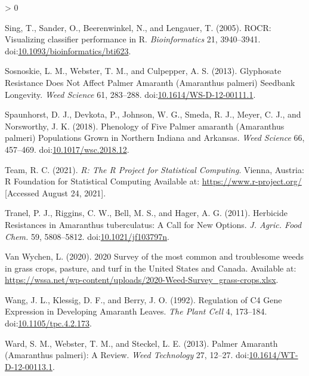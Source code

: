 \documentclass[utf8]{frontiersSCNS}
\newlength{\cslhangindent}
\newenvironment{CSLReferences}[2] %
 {%
  \setlength{\parindent}{0pt}
  \ifodd #1 \everypar{\setlength{\hangindent}{\cslhangindent}}\ignorespaces\fi
  \ifnum #2 > 0
  \setlength{\parskip}{#2\baselineskip}
  \fi
 }%
 {}
\begin{document}
\begin{CSLReferences}{1}{0}
\leavevmode\hypertarget{ref-sing2005}{}%
Sing, T., Sander, O., Beerenwinkel, N., and Lengauer, T. (2005). {ROCR}:
Visualizing classifier performance in {R}. \emph{Bioinformatics} 21,
3940--3941.
doi:\href{https://doi.org/10.1093/bioinformatics/bti623}{10.1093/bioinformatics/bti623}.

\leavevmode\hypertarget{ref-sosnoskie2013}{}%
Sosnoskie, L. M., Webster, T. M., and Culpepper, A. S. (2013).
Glyphosate {Resistance Does Not Affect Palmer Amaranth} ({Amaranthus}
palmeri) {Seedbank Longevity}. \emph{Weed Science} 61, 283--288.
doi:\href{https://doi.org/10.1614/WS-D-12-00111.1}{10.1614/WS-D-12-00111.1}.

\leavevmode\hypertarget{ref-spaunhorst2018}{}%
Spaunhorst, D. J., Devkota, P., Johnson, W. G., Smeda, R. J., Meyer, C.
J., and Norsworthy, J. K. (2018). Phenology of {Five Palmer} amaranth
({Amaranthus} palmeri) {Populations Grown} in {Northern Indiana} and
{Arkansas}. \emph{Weed Science} 66, 457--469.
doi:\href{https://doi.org/10.1017/wsc.2018.12}{10.1017/wsc.2018.12}.

\leavevmode\hypertarget{ref-rcoreteam2021}{}%
Team, R. C. (2021). \emph{R: {The R Project} for {Statistical
Computing}}. {Vienna, Austria}: {R Foundation for Statistical Computing}
Available at: \url{https://www.r-project.org/} {[}Accessed August 24,
2021{]}.

\leavevmode\hypertarget{ref-tranel2011}{}%
Tranel, P. J., Riggins, C. W., Bell, M. S., and Hager, A. G. (2011).
Herbicide {Resistances} in {Amaranthus} tuberculatus: {A Call} for {New
Options}. \emph{J. Agric. Food Chem.} 59, 5808--5812.
doi:\href{https://doi.org/10.1021/jf103797n}{10.1021/jf103797n}.

\leavevmode\hypertarget{ref-vanwychen2020}{}%
Van Wychen, L. (2020). 2020 {Survey} of the most common and troublesome
weeds in grass crops, pasture, and turf in the {United States} and
{Canada}. Available at:
\url{https://wssa.net/wp-content/uploads/2020-Weed-Survey_grass-crops.xlsx}.

\leavevmode\hypertarget{ref-wang1992}{}%
Wang, J. L., Klessig, D. F., and Berry, J. O. (1992). Regulation of {C4
Gene Expression} in {Developing Amaranth Leaves}. \emph{The Plant Cell}
4, 173--184.
doi:\href{https://doi.org/10.1105/tpc.4.2.173}{10.1105/tpc.4.2.173}.

\leavevmode\hypertarget{ref-ward2013}{}%
Ward, S. M., Webster, T. M., and Steckel, L. E. (2013). Palmer
{Amaranth} ({Amaranthus} palmeri): {A Review}. \emph{Weed Technology}
27, 12--27.
doi:\href{https://doi.org/10.1614/WT-D-12-00113.1}{10.1614/WT-D-12-00113.1}.


\end{CSLReferences}
\end{document}
